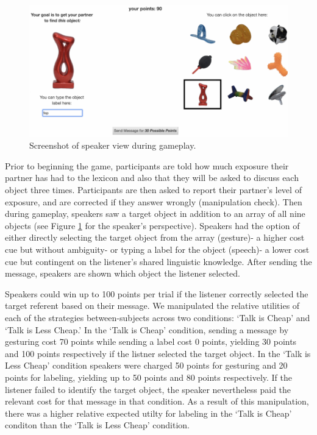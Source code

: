 \documentclass[10pt, letterpaper]{article}
\newenvironment{CodeChunk}{}{}
\begin{document}
\begin{CodeChunk}
\begin{figure}[tb]

{\centering \includegraphics{figs/exp_screenshot-1} 

}

\caption[Screenshot of speaker view during gameplay]{Screenshot of speaker view during gameplay.}\label{fig:exp_screenshot}
\end{figure}
\end{CodeChunk}

Prior to beginning the game, participants are told how much exposure
their partner has had to the lexicon and also that they will be asked to
discuss each object three times. Participants are then asked to report
their partner's level of exposure, and are corrected if they answer
wrongly (manipulation check). Then during gameplay, speakers saw a
target object in addition to an array of all nine objects (see Figure
\ref{fig:exp_screenshot} for the speaker's perspective). Speakers had
the option of either directly selecting the target object from the array
(gesture)- a higher cost cue but without ambiguity- or typing a label
for the object (speech)- a lower cost cue but contingent on the
listener's shared linguistic knowledge. After sending the message,
speakers are shown which object the listener selected.

Speakers could win up to 100 points per trial if the listener correctly
selected the target referent based on their message. We manipulated the
relative utilities of each of the strategies between-subjects across two
conditions: `Talk is Cheap' and `Talk is Less Cheap.' In the `Talk is
Cheap' condition, sending a message by gesturing cost 70 points while
sending a label cost 0 points, yielding 30 points and 100 points
respectively if the listner selected the target object. In the `Talk is
Less Cheap' condition speakers were charged 50 points for gesturing and
20 points for labeling, yielding up to 50 points and 80 points
respectively. If the listener failed to identify the target object, the
speaker nevertheless paid the relevant cost for that message in that
condition. As a result of this manipulation, there was a higher relative
expected utilty for labeling in the `Talk is Cheap' conditon than the
`Talk is Less Cheap' condition.
\end{document}

